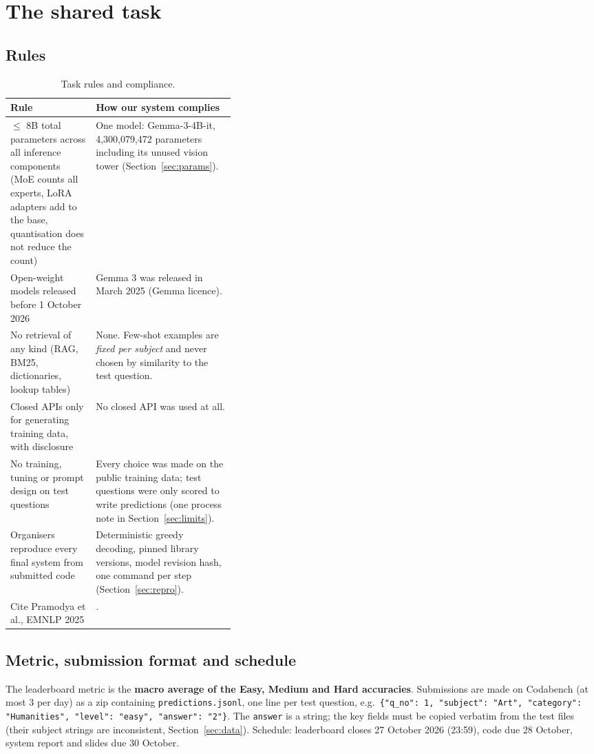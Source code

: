 \documentclass[10pt,a4paper]{article}
\begin{document}
\section{The shared task}\label{sec:task}
\subsection{Rules}
\begin{table}[h]
\centering\small
\begin{tabularx}{\linewidth}{>{\raggedright\arraybackslash}p{0.38\linewidth}X}
\toprule
Rule & How our system complies\\
\midrule
$\le$ 8B total parameters across all inference components (MoE counts all experts, LoRA adapters add to the base,
quantisation does not reduce the count) & One model: Gemma-3-4B-it, 4,300,079,472 parameters including its unused vision
tower (Section~\ref{sec:params}).\\
Open-weight models released before 1 October 2026 & Gemma 3 was released in March 2025 (Gemma licence).\\
No retrieval of any kind (RAG, BM25, dictionaries, lookup tables) & None. Few-shot examples are \emph{fixed per subject}
and never chosen by similarity to the test question.\\
Closed APIs only for generating training data, with disclosure & No closed API was used at all.\\
No training, tuning or prompt design on test questions & Every choice was made on the public training data; test
questions were only scored to write predictions (one process note in Section~\ref{sec:limits}).\\
Organisers reproduce every final system from submitted code & Deterministic greedy decoding, pinned library versions,
model revision hash, one command per step (Section~\ref{sec:repro}).\\
Cite Pramodya et al., EMNLP 2025 & \cite{pramodya2025}.\\
\bottomrule
\end{tabularx}
\caption{Task rules and compliance.}
\end{table}

\subsection{Metric, submission format and schedule}
The leaderboard metric is the \textbf{macro average of the Easy, Medium and Hard accuracies}. Submissions are made on
Codabench (at most 3 per day) as a zip containing \texttt{predictions.jsonl}, one line per test question, e.g.\
\verb|{"q_no": 1, "subject": "Art", "category": "Humanities", "level": "easy", "answer": "2"}|.
The \texttt{answer} is a string; the key fields must be copied verbatim from the test files (their subject strings
are inconsistent, Section~\ref{sec:data}). Schedule: leaderboard closes 27 October 2026 (23:59), code due
28 October, system report and slides due 30 October.
\end{document}
